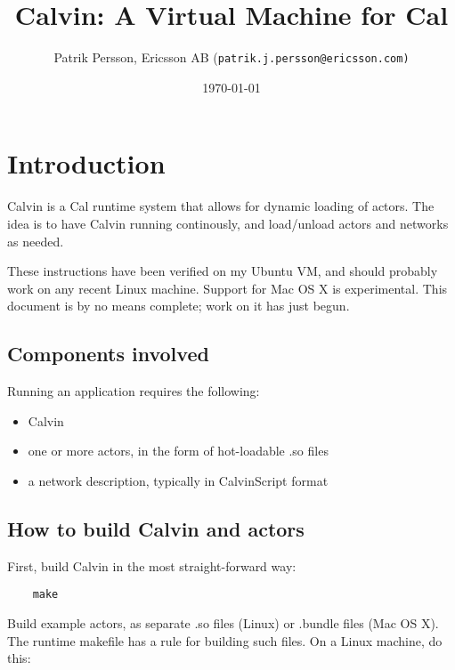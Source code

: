 \documentclass[10pt, a4paper]{article}
\title{Calvin: A Virtual Machine for Cal}
\author{Patrik Persson, Ericsson AB (\texttt{patrik.j.persson@ericsson.com)}}
\date{\today}
\begin{document}
\maketitle

\vfill

\tableofcontents

\vfill

\newpage

\section{Introduction}

\label{QuickIntro}

Calvin is a Cal runtime system that allows for dynamic loading of
actors. The idea is to have Calvin running continously, and
load/unload actors and networks as needed.

\vspace{5mm}\noindent%
These instructions have been verified on my
Ubuntu VM, and should probably work on any recent Linux
machine. Support for Mac OS X is experimental. This document is by no
means complete; work on it has just begun.

\subsection{Components involved}

Running an application requires the following:

\begin{itemize}
\item Calvin
\item one or more actors, in the form of hot-loadable .so files
\item a network description, typically in CalvinScript format
\end{itemize}

\subsection{How to build Calvin and actors}

First, build Calvin in the most straight-forward way:

\begin{verbatim}
    make
\end{verbatim}

Build example actors, as separate .so files (Linux) or .bundle
   files (Mac OS X). The runtime makefile has a rule for building such
   files. On a Linux machine, do this:
\end{document}
